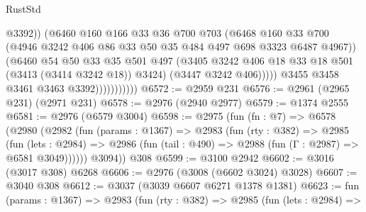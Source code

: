 \begin{lexlean}{RustStd}
\begin{coremodule}
                                  @3392))
                              (@6460
                                @160
                                @166
                                @33
                                @36
                                @700
                                @703
                                (@6468
                                  @160
                                  @33
                                  @700
                                  (@4946
                                    @3242
                                    @406
                                    @86
                                    @33
                                    @50
                                    @35
                                    @484
                                    @497
                                    @698
                                    @3323
                                    @6487
                                    @4967))
                                (@6460
                                  @54
                                  @50
                                  @33
                                  @35
                                  @501
                                  @497
                                  (@3405
                                    @3242
                                    @406
                                    @18
                                    @33
                                    @18
                                    @501
                                    (@3413 (@3414 @3242 @18))
                                    @3424)
                                  (@3447 @3242 @406)))))
                          @3455
                          @3458
                          @3461
                          @3463
                          @3392)))))))))))
@6572 := @2959 @231
@6576 := @2961 (@2965 @231) (@2971 @231)
@6578 := @2976 (@2940 @2977)
@6579 := @1374 @2555
@6581 := @2976 (@6579 @3004)
@6598 := @2975
    (fun (fn : @7) =>
    @6578
      (@2980
        (@2982
          (fun (params : @1367) =>
          @2983
            (fun (rty : @382) =>
            @2985
              (fun (lets : @2984) =>
              @2986 (fun (tail : @490) => @2988 (fun (Γ : @2987) => @6581 @3049))))))
        @3094))
    @308
@6599 := @3100 @2942
@6602 := @3016 (@3017 @308) @6268
@6606 := @2976 (@3008 (@6602 @3024) @3028)
@6607 := @3040 @308
@6612 := @3037 (@3039 @6607 @6271 @1378 @1381)
@6623 := fun (params : @1367) =>
  @2983
    (fun (rty : @382) =>
    @2985
      (fun (lets : @2984) =>

\end{coremodule}
\end{lexlean}
